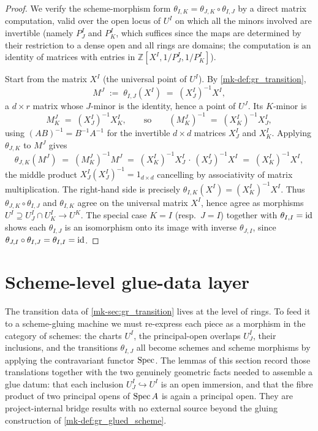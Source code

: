 \begin{proof}
  \leanok
  We verify the scheme-morphism form
  \(\theta_{I,K} = \theta_{J,K} \circ \theta_{I,J}\) by a direct matrix
  computation, valid over the open locus of \(U^I\) on which all the minors
  involved are invertible (namely \(P^I_J\) and \(P^I_K\), which suffices since
  the maps are determined by their restriction to a dense open and all rings are
  domains; the computation is an identity of matrices with entries in
  \(\mathbb{Z}[X^I, 1/P^I_J, 1/P^I_K]\)).

  Start from the matrix \(X^I\) (the universal point of \(U^I\)). By
  \ref{mk-def:gr_transition},
  \[
    M^J \;:=\; \theta_{I,J}(X^I) \;=\; (X^I_J)^{-1} X^I,
  \]
  a \(d \times r\) matrix whose \(J\)-minor is the identity, hence a point of
  \(U^J\). Its \(K\)-minor is
  \[
    M^J_K \;=\; (X^I_J)^{-1} X^I_K,
    \qquad\text{so}\qquad
    (M^J_K)^{-1} \;=\; (X^I_K)^{-1} X^I_J,
  \]
  using \((AB)^{-1} = B^{-1} A^{-1}\) for the invertible \(d \times d\) matrices
  \(X^I_J\) and \(X^I_K\). Applying \(\theta_{J,K}\) to \(M^J\) gives
  \[
    \theta_{J,K}(M^J) \;=\; (M^J_K)^{-1} M^J
    \;=\; (X^I_K)^{-1} X^I_J \,\cdot\, (X^I_J)^{-1} X^I
    \;=\; (X^I_K)^{-1} X^I,
  \]
  the middle product \(X^I_J (X^I_J)^{-1} = 1_{d\times d}\) cancelling by
  associativity of matrix multiplication. The right-hand side is precisely
  \(\theta_{I,K}(X^I) = (X^I_K)^{-1} X^I\). Thus
  \(\theta_{J,K} \circ \theta_{I,J}\) and \(\theta_{I,K}\) agree on the
  universal matrix \(X^I\), hence agree as morphisms \(U^I \supseteq U^I_J \cap
  U^I_K \to U^K\). The special case \(K = I\) (resp.\ \(J = I\)) together with
  \(\theta_{I,I} = \operatorname{id}\) shows each \(\theta_{I,J}\) is an isomorphism onto its
  image with inverse \(\theta_{J,I}\), since
  \(\theta_{J,I} \circ \theta_{I,J} = \theta_{I,I} = \operatorname{id}\).
\end{proof}

\section{Scheme-level glue-data layer}
\label{mk-sec:gr_glue_layer}

The transition data of \ref{mk-sec:gr_transition} lives at the level of rings. To
feed it to a scheme-gluing machine we must re-express each piece as a morphism in
the category of schemes: the charts \(U^I\), the principal-open overlaps
\(U^I_J\), their inclusions, and the transitions \(\theta_{I,J}\) all become
schemes and scheme morphisms by applying the contravariant functor \(\operatorname{Spec}\).
The lemmas of this section record those translations together with the two
genuinely geometric facts needed to assemble a glue datum: that each inclusion
\(U^I_J \hookrightarrow U^I\) is an open immersion, and that the fibre product of
two principal opens of \(\operatorname{Spec} A\) is again a principal open. They are
project-internal bridge results with no external source beyond the gluing
construction of \ref{mk-def:gr_glued_scheme}.

